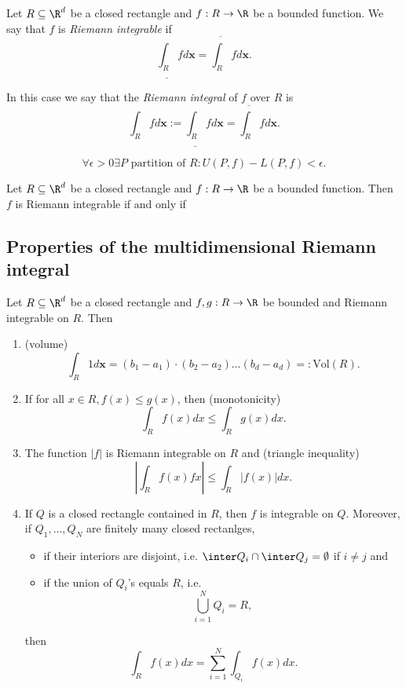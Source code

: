 \begin{definition}
    Let $R \subseteq \R^d$ be a closed rectangle and $f:R \to \R$ be a bounded function.
    We say that $f$ is \emph{Riemann integrable} if
    $$\underline{\int_R} f d\mathbf{x} = \overline{\int_R} f d\mathbf{x}.$$

    In this case we say that the \emph{Riemann integral} of $f$ over $R$ is
    $$\int_R f d\mathbf{x} := \underline{\int_R} f d\mathbf{x} = \overline{\int_R} f d\mathbf{x}.$$
\end{definition}
    $$\forall \epsilon > 0 \exists P \text{ partition of } R: U(P,f) - L(P,f) < \epsilon.$$

\begin{proposition}
    Let $R \subseteq \R^d$ be a closed rectangle and $f:R \to \R$ be a bounded function.
    Then $f$ is Riemann integrable if and only if
    \begin{myCenter}
    \end{myCenter}
\end{proposition}

\subsection{Properties of the multidimensional Riemann integral}
\begin{proposition}
    Let $R \subseteq \R^d$ be a closed rectangle and $f,g:R \to \R$ be bounded
    and Riemann integrable on $R$. Then
    \begin{enumerate}
        \item \hfill (volume)
            $$\int_R 1 d\mathbf{x} =(b_1-a_1)\cdot(b_2-a_2)\dots(b_d-a_d) =: \text{Vol}(R).$$
        \item If for all $x \in R, f(x) \le g(x)$, then \hfill (monotonicity)
            $$\int_Rf(x)dx \le \int_Rg(x)dx.$$
        \item The function $|f|$ is Riemann integrable on $R$ and \hfill (triangle inequality)
            $$\left|\int_Rf(x)fx\right| \le \int_R|f(x)|dx.$$
        \item If $Q$ is a closed rectangle contained in $R$, then $f$ is integrable on $Q$.
            Moreover, if $Q_1, \dots, Q_N$ are finitely many closed rectanlges,
            \begin{itemize}
                \item if their interiors are disjoint, i.e. $\inter Q_i \cap \inter Q_j = \emptyset$ if $i \ne j$ and
                \item if the union of $Q_i$'s equals $R$, i.e.
                    $$\bigcup_{i=1}^NQ_i = R,$$
            \end{itemize}
            then
            $$\int_Rf(x)dx = \sum_{i=1}^N\int_{Q_i}f(x)dx.$$
    \end{enumerate}
\end{proposition}


